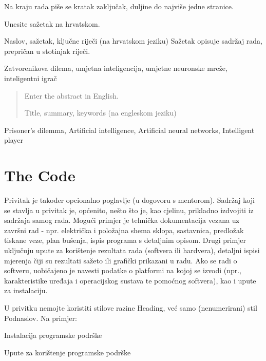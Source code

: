 \documentclass[zavrsnirad]{fer}
\begin{document}
Na kraju rada piše se kratak zaključak, duljine do najviše jedne stranice. 








\begin{sazetak}
  Unesite sažetak na hrvatskom.

	Naslov, sažetak, ključne riječi (na hrvatskom jeziku)
	Sažetak opisuje sadržaj rada, prepričan u stotinjak riječi. 

\end{sazetak}

\begin{kljucnerijeci}
	Zatvorenikova dilema, umjetna inteligencija, umjetne neuronske mreže, inteligentni igrač
\end{kljucnerijeci}


\begin{abstract}
  Enter the abstract in English.
  
  Title, summary, keywords (na engleskom jeziku)
  
\end{abstract}

\begin{keywords}
  Prisoner's dilemma, Artificial intelligence, Artificial neural networks, Intelligent player
\end{keywords}



\backmatter

\chapter{The Code}

	Privitak je također opcionalno poglavlje (u dogovoru s mentorom). 
	Sadržaj koji se stavlja u privitak je, općenito, nešto što je, kao cjelinu, prikladno izdvojiti iz sadržaja samog rada.
	Mogući primjer je tehnička dokumentacija vezana uz završni rad - npr. električka i položajna shema sklopa, sastavnica, predložak tiskane veze, plan bušenja, ispis programa s detaljnim opisom.
	Drugi primjer uključuju upute za korištenje rezultata rada (softvera ili hardvera), detaljni ispisi mjerenja čiji su rezultati sažeto ili grafički prikazani u radu. Ako se radi o softveru, uobičajeno je navesti podatke o platformi na kojoj se izvodi (npr., karakteristike uređaja i operacijskog sustava te pomoćnog softvera), kao i upute za instalaciju. 
	
	U privitku nemojte koristiti stilove razine Heading, već samo (nenumerirani) stil Podnaslov. 
	Na primjer:
	
	Instalacija programske podrške
	
	Upute za korištenje programske podrške


\end{document}
